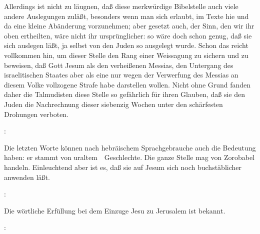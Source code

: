 \begin{aufza}
\item[]Allerdings ist nicht zu läugnen, daß diese merkwürdige Bibelstelle auch viele andere Auslegungen zuläßt, besonders wenn man sich erlaubt, im Texte hie und da eine kleine Abänderung vorzunehmen; aber gesetzt auch, der Sinn, den wir ihr oben ertheilten, wäre nicht ihr ursprünglicher: so wäre doch schon genug, daß sie  sich auslegen läßt, ja selbst von den Juden so ausgelegt wurde. Schon das reicht vollkommen hin, um dieser Stelle den Rang einer Weissagung zu sichern und zu beweisen, daß Gott Jesum als den verheißenen Messias, den Untergang des israelitischen Staates aber als eine nur wegen der Verwerfung des Messias an diesem Volke vollzogene Strafe habe darstellen wollen. Nicht ohne Grund fanden daher die Talmudisten diese Stelle so gefährlich für ihren Glauben, daß sie den Juden die Nachrechnung dieser siebenzig Wochen unter den schärfesten Drohungen verboten.
\item {}: 
\end{aufza}\par
Die letzten Worte können nach hebräischem Sprachgebrauche auch die Bedeutung haben: er stammt von uraltem~\ Geschlechte. Die ganze Stelle mag von Zorobabel handeln. Einleuchtend aber ist es, daß sie auf Jesum sich noch buchstäblicher anwenden läßt.
\begin{aufza}\setcounter{enumi}{5}
\item {}: 
\end{aufza}\par
Die wörtliche Erfüllung bei dem Einzuge Jesu zu Jerusalem ist bekannt.
\begin{aufza}\setcounter{enumi}{6}
\item {}: 
\end{aufza}\par
